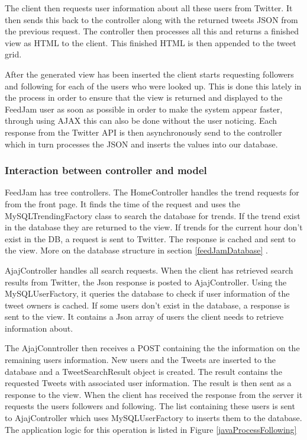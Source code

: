 The client then requests user information about all these users from Twitter. It then sends this back to the controller along with the returned tweets JSON from the previous request. The controller then processes all this and returns a finished view as HTML to the client. This finished HTML is then appended to the tweet grid.

After the generated view has been inserted the client starts requesting followers and following for each of the users who were looked up. This is done this lately in the process in order to ensure that the view is returned and displayed to the FeedJam user as soon as possible in order to make the system appear faster, through using AJAX this can also be done without the user noticing. Each response from the Twitter API is then asynchronously send to the controller which in turn processes the JSON and inserts the values into our database.

\subsubsection{Interaction between controller and model} %
FeedJam has tree controllers. The HomeController handles the trend requests for from the front page. It finds the time of the request and uses the MySQLTrendingFactory class to search the database for trends. If the trend exist in the database they are returned to the view. If trends for the current hour don't exist in the DB, a request is sent to Twitter. The response is cached and sent to the view. More on the database structure in section \ref{feedJamDatabase} .

AjajController handles all search requests. When the client has retrieved search results from Twitter, the Json response is posted to AjajController. Using the MySQLUserFactory, it queries the database to check if user information of the tweet owners is cached. If some users don't exist in the database, a response is sent to the view. It contains a Json array of users the client needs to retrieve information about. 

The AjajConntroller then receives a POST containing the the information on the remaining users information. New users and the Tweets are inserted to the database and a TweetSearchResult object is created. The result contains the requested Tweets with associated user information. The result is then sent as a response to the view. When the client has received the response from the server it requests the users followers and following. The list containing these users is sent to AjajController which uses MySQLUserFactory to inserts them to the database. The application logic for this operation is listed in Figure \ref{javaProcessFollowing}

